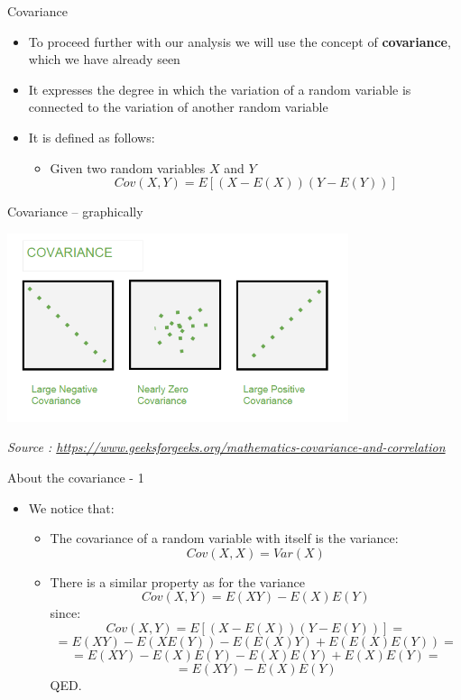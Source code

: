 \documentclass{beamer}
\begin{document}
\begin{frame}
{\centerline{Covariance}}

\begin{itemize}
\item To proceed further with our analysis we will use the concept of \textbf{covariance}, which we have already seen
\item It expresses the degree in which the variation of a random variable is connected to the variation of another random variable
\item It is defined as follows:
\begin{itemize}
\item Given two random variables $X$ and $Y$
$$Cov(X,Y) = E[ (X - E(X))(Y - E(Y))]$$
\end{itemize}
\end{itemize}

\end{frame}


\begin{frame}
{\centerline{Covariance -- graphically}}


\begin{center}
\includegraphics[width=10cm]{P2023.AIBCCSS.FoundationsDataScience/Covar.png}
\end{center} 
\textit{\small
Source : \url{https://www.geeksforgeeks.org/mathematics-covariance-and-correlation}}
\end{frame}


\begin{frame}
{\centerline{About the covariance - 1}}

\begin{itemize}
\item We notice that:
\begin{itemize}
\item The covariance of a random variable with itself is the variance:
$$Cov(X,X) = Var(X)$$
\item There is a similar property as for the variance
$$Cov(X,Y) = E(XY) - E(X)E(Y)$$
since:
$$Cov(X,Y) = E[ (X - E(X))(Y - E(Y))] = $$
$$ = E(XY) - E(XE(Y)) - E(E(X)Y) + E(E(X)E(Y)) =$$
$$ = E(XY) - E(X)E(Y) - E(X)E(Y) + E(X)E(Y) = $$
$$ = E(XY) - E(X)E(Y)$$
QED.


\end{itemize}


\end{itemize}

\end{frame}
\end{document}
